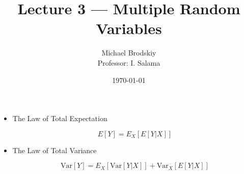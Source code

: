 


\title{Lecture 3 — Multiple Random Variables}
\date{\today}
\author{Michael Brodskiy\\ \small Professor: I. Salama}



\maketitle

\begin{itemize}

  \item The Law of Total Expectation

    $$E[Y]=E_X[E[Y|X]]$$

  \item The Law of Total Variance

    $$\text{Var}[Y]=E_X[\text{Var}[Y|X]]+\text{Var}_X[E[Y|X]]$$

\end{itemize}



